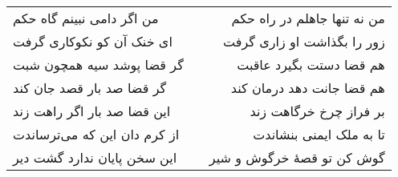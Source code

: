\begin{center}
\begin{longtable}{l p{0.5cm} r}
من اگر دامی نبینم گاه حکم
&&
من نه تنها جاهلم در راه حکم
\\
ای خنک آن کو نکوکاری گرفت
&&
زور را بگذاشت او زاری گرفت
\\
گر قضا پوشد سیه همچون شبت
&&
هم قضا دستت بگیرد عاقبت
\\
گر قضا صد بار قصد جان کند
&&
هم قضا جانت دهد درمان کند
\\
این قضا صد بار اگر راهت زند
&&
بر فراز چرخ خرگاهت زند
\\
از کرم دان این که می‌ترساندت
&&
تا به ملک ایمنی بنشاندت
\\
این سخن پایان ندارد گشت دیر
&&
گوش کن تو قصهٔ خرگوش و شیر
\\
\end{longtable}
\end{center}
